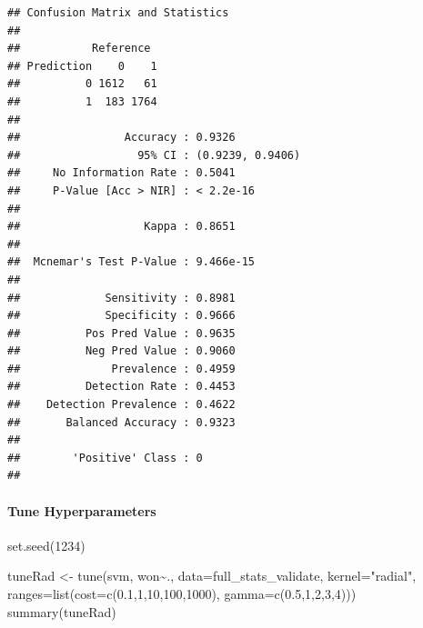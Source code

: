 \documentclass[
]{article}
\newenvironment{Shaded}{\begin{snugshade}}{\end{snugshade}}
\newcommand{\AttributeTok}[1]{\textcolor[rgb]{0.77,0.63,0.00}{#1}}
\newcommand{\DecValTok}[1]{\textcolor[rgb]{0.00,0.00,0.81}{#1}}
\newcommand{\FloatTok}[1]{\textcolor[rgb]{0.00,0.00,0.81}{#1}}
\newcommand{\FunctionTok}[1]{\textcolor[rgb]{0.00,0.00,0.00}{#1}}
\newcommand{\NormalTok}[1]{#1}
\newcommand{\OtherTok}[1]{\textcolor[rgb]{0.56,0.35,0.01}{#1}}
\newcommand{\SpecialCharTok}[1]{\textcolor[rgb]{0.00,0.00,0.00}{#1}}
\newcommand{\StringTok}[1]{\textcolor[rgb]{0.31,0.60,0.02}{#1}}
\begin{document}
\begin{verbatim}
## Confusion Matrix and Statistics
## 
##           Reference
## Prediction    0    1
##          0 1612   61
##          1  183 1764
##                                           
##                Accuracy : 0.9326          
##                  95% CI : (0.9239, 0.9406)
##     No Information Rate : 0.5041          
##     P-Value [Acc > NIR] : < 2.2e-16       
##                                           
##                   Kappa : 0.8651          
##                                           
##  Mcnemar's Test P-Value : 9.466e-15       
##                                           
##             Sensitivity : 0.8981          
##             Specificity : 0.9666          
##          Pos Pred Value : 0.9635          
##          Neg Pred Value : 0.9060          
##              Prevalence : 0.4959          
##          Detection Rate : 0.4453          
##    Detection Prevalence : 0.4622          
##       Balanced Accuracy : 0.9323          
##                                           
##        'Positive' Class : 0               
## 
\end{verbatim}

\hypertarget{tune-hyperparameters}{%
\paragraph{Tune Hyperparameters}\label{tune-hyperparameters}}

\begin{Shaded}
\begin{Highlighting}[]
\FunctionTok{set.seed}\NormalTok{(}\DecValTok{1234}\NormalTok{)}

\NormalTok{tuneRad }\OtherTok{\textless{}{-}} \FunctionTok{tune}\NormalTok{(svm, won}\SpecialCharTok{\textasciitilde{}}\NormalTok{., }\AttributeTok{data=}\NormalTok{full\_stats\_validate, }\AttributeTok{kernel=}\StringTok{"radial"}\NormalTok{, }\AttributeTok{ranges=}\FunctionTok{list}\NormalTok{(}\AttributeTok{cost=}\FunctionTok{c}\NormalTok{(}\FloatTok{0.1}\NormalTok{,}\DecValTok{1}\NormalTok{,}\DecValTok{10}\NormalTok{,}\DecValTok{100}\NormalTok{,}\DecValTok{1000}\NormalTok{), }\AttributeTok{gamma=}\FunctionTok{c}\NormalTok{(}\FloatTok{0.5}\NormalTok{,}\DecValTok{1}\NormalTok{,}\DecValTok{2}\NormalTok{,}\DecValTok{3}\NormalTok{,}\DecValTok{4}\NormalTok{)))}
\FunctionTok{summary}\NormalTok{(tuneRad)}
\end{Highlighting}
\end{Shaded}
\end{document}
